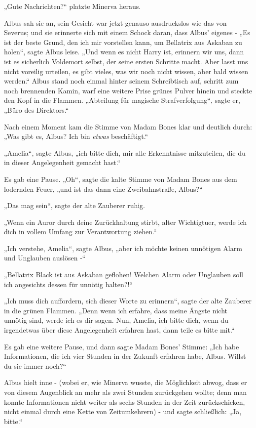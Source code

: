 {„Gute Nachrichten?“ platzte Minerva heraus.

Albus sah sie an, sein Gesicht war jetzt genauso ausdruckslos wie das von Severus; und sie erinnerte sich mit einem Schock daran, dass Albus' eigenes - „Es ist der beste Grund, den ich mir vorstellen kann, um Bellatrix aus Askaban zu holen“, sagte Albus leise. „Und wenn es nicht Harry ist, erinnern wir uns, dann ist es sicherlich Voldemort selbst, der seine ersten Schritte macht. Aber lasst uns nicht voreilig urteilen, es gibt vieles, was wir noch nicht wissen, aber bald wissen werden.“ Albus stand noch einmal hinter seinem Schreibtisch auf, schritt zum noch brennenden Kamin, warf eine weitere Prise grünes Pulver hinein und steckte den Kopf in die Flammen. „Abteilung für magische Strafverfolgung“, sagte er, „Büro des Direktors.“

Nach einem Moment kam die Stimme von Madam Bones klar und deutlich durch: „Was gibt es, Albus? Ich bin \emph{etwas} beschäftigt.“

„Amelia“, sagte Albus, „ich bitte dich, mir alle Erkenntnisse mitzuteilen, die du in dieser Angelegenheit gemacht hast.“

Es gab eine Pause. „Oh“, sagte die kalte Stimme von Madam Bones aus dem lodernden Feuer, „und ist das dann eine Zweibahnstraße, Albus?“

„Das mag sein“, sagte der alte Zauberer ruhig.

„Wenn ein Auror durch deine Zurückhaltung stirbt, alter Wichtigtuer, werde ich dich in vollem Umfang zur Verantwortung ziehen.“

„Ich verstehe, Amelia“, sagte Albus, „aber ich möchte keinen unnötigen Alarm und Unglauben auslösen -“

„Bellatrix Black ist aus Askaban geflohen! Welchen Alarm oder Unglauben soll ich angesichts dessen für unnötig halten?!“

„Ich muss dich auffordern, sich dieser Worte zu erinnern“, sagte der alte Zauberer in die grünen Flammen. „Denn wenn ich erfahre, dass meine Ängste nicht unnötig sind, werde ich es dir sagen. Nun, Amelia, ich bitte dich, wenn du irgendetwas über diese Angelegenheit erfahren hast, dann teile es bitte mit.“

Es gab eine weitere Pause, und dann sagte Madam Bones' Stimme: „Ich habe Informationen, die ich vier Stunden in der Zukunft erfahren habe, Albus. Willst du sie immer noch?“

Albus hielt inne - (wobei er, wie Minerva wusste, die Möglichkeit abwog, dass er von diesem Augenblick an mehr als zwei Stunden zurückgehen wollte; denn man konnte Informationen nicht weiter als sechs Stunden in der Zeit zurückschicken, nicht einmal durch eine Kette von Zeitumkehrern) - und sagte schließlich: „Ja, bitte.“

}
